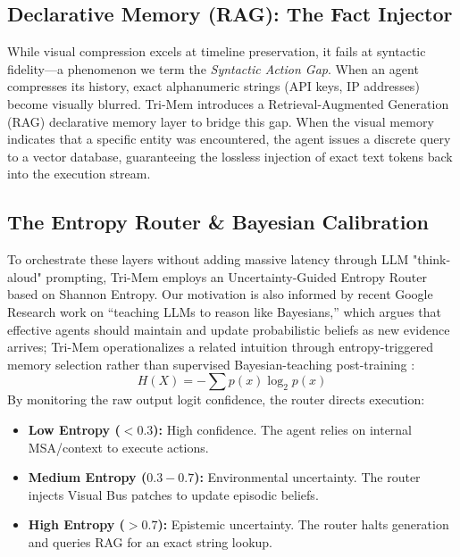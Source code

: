 \documentclass[conference]{IEEEtran}
\begin{document}
\subsection{Declarative Memory (RAG): The Fact Injector}
While visual compression excels at timeline preservation, it fails at syntactic fidelity---a phenomenon we term the \textit{Syntactic Action Gap}. When an agent compresses its history, exact alphanumeric strings (API keys, IP addresses) become visually blurred. Tri-Mem introduces a Retrieval-Augmented Generation (RAG) declarative memory layer to bridge this gap. When the visual memory indicates that a specific entity was encountered, the agent issues a discrete query to a vector database, guaranteeing the lossless injection of exact text tokens back into the execution stream.

\subsection{The Entropy Router \& Bayesian Calibration}
To orchestrate these layers without adding massive latency through LLM "think-aloud" prompting, Tri-Mem employs an Uncertainty-Guided Entropy Router based on Shannon Entropy. Our motivation is also informed by recent Google Research work on ``teaching LLMs to reason like Bayesians,'' which argues that effective agents should maintain and update probabilistic beliefs as new evidence arrives; Tri-Mem operationalizes a related intuition through entropy-triggered memory selection rather than supervised Bayesian-teaching post-training \cite{googlebayes2026}:
\begin{equation}
H(X) = -\sum p(x) \log_2 p(x)
\end{equation}
By monitoring the raw output logit confidence, the router directs execution:
\begin{itemize}
    \item \textbf{Low Entropy ($< 0.3$):} High confidence. The agent relies on internal MSA/context to execute actions.
    \item \textbf{Medium Entropy ($0.3 - 0.7$):} Environmental uncertainty. The router injects Visual Bus patches to update episodic beliefs.
    \item \textbf{High Entropy ($> 0.7$):} Epistemic uncertainty. The router halts generation and queries RAG for an exact string lookup.
\end{itemize}
\end{document}
